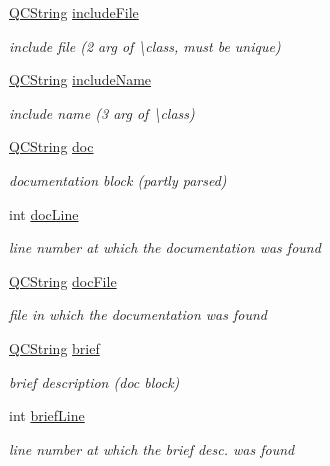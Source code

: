 \begin{DoxyCompactItemize}
\hyperlink{class_q_c_string}{Q\+C\+String} \hyperlink{class_entry_a88c55fcdd65a52dce640136f18adccf2}{include\+File}
\begin{DoxyCompactList}\small\item\em include file (2 arg of \textbackslash{}class, must be unique) \end{DoxyCompactList}\item 
\hyperlink{class_q_c_string}{Q\+C\+String} \hyperlink{class_entry_a32626ce14eb253f6da64ed475419a4ac}{include\+Name}
\begin{DoxyCompactList}\small\item\em include name (3 arg of \textbackslash{}class) \end{DoxyCompactList}\item 
\hyperlink{class_q_c_string}{Q\+C\+String} \hyperlink{class_entry_ac02a6c1dd922221351f6de0286d48d77}{doc}
\begin{DoxyCompactList}\small\item\em documentation block (partly parsed) \end{DoxyCompactList}\item 
int \hyperlink{class_entry_a180b5fdd7f3b963e4b0d2c4ea6e0b1b5}{doc\+Line}
\begin{DoxyCompactList}\small\item\em line number at which the documentation was found \end{DoxyCompactList}\item 
\hyperlink{class_q_c_string}{Q\+C\+String} \hyperlink{class_entry_ac6841c6ec8fd7ae6121364e7e1895e94}{doc\+File}
\begin{DoxyCompactList}\small\item\em file in which the documentation was found \end{DoxyCompactList}\item 
\hyperlink{class_q_c_string}{Q\+C\+String} \hyperlink{class_entry_ad602ba19af5785515ed81790d843ce4c}{brief}
\begin{DoxyCompactList}\small\item\em brief description (doc block) \end{DoxyCompactList}\item 
int \hyperlink{class_entry_add7a19978ab2b30a9755b8d5e3cbd00a}{brief\+Line}
\begin{DoxyCompactList}\small\item\em line number at which the brief desc. was found \end{DoxyCompactList}\item 

\end{DoxyCompactItemize}
